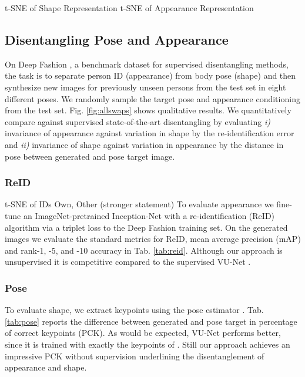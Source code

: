 	t-SNE of Shape Representation
	t-SNE of Appearance Representation


	\subsection{Disentangling Pose and Appearance}


	On Deep Fashion \cite{liu16deepfashion, liu16deepfashionwild}, a benchmark dataset for supervised disentangling methods, the task is to separate person ID (appearance) from body pose (shape) and then synthesize new images for previously unseen persons from the test set in eight different poses. We randomly sample the target pose and appearance conditioning from the test set. Fig. \ref{fig:allswaps} shows qualitative results.
	We quantitatively compare against supervised state-of-the-art disentangling \cite{esser18} by evaluating \emph{i)} invariance of appearance against variation in shape by the re-identification error and \emph{ii)} invariance of shape against variation in appearance by the distance in pose between generated and pose target image.

	\subsubsection{ReID}
	t-SNE of IDs
	Own, Other (stronger statement)
	To evaluate appearance we fine-tune an ImageNet-pretrained \cite{russakovsky15imagenet} Inception-Net \cite{szegedy15inception} with a re-identification (ReID) algorithm \cite{xiao17reidjoint} via a triplet loss \cite{hermans17reidtriplet} to the Deep Fashion training set.
	On the generated images we evaluate the standard metrics for ReID, mean average precision (mAP) and rank-1, -5, and -10 accuracy in Tab. \ref{tab:reid}.
	Although our approach is unsupervised it is competitive compared to the supervised VU-Net \cite{esser18}.



	\subsubsection{Pose}
	To evaluate shape, we extract keypoints using the pose estimator \cite{cao17affinityfield}. Tab. \ref{tab:pose} reports the difference between generated and pose target in percentage of correct keypoints (PCK). As would be expected, VU-Net performs better, since it is trained with exactly the keypoints of \cite{cao17affinityfield}. Still our approach achieves an impressive PCK without supervision underlining the disentanglement of appearance and shape.


